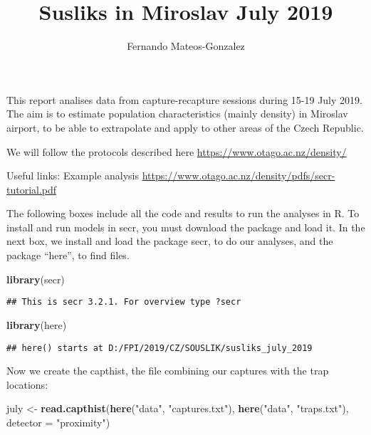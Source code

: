 \documentclass[]{article}
\title{Susliks in Miroslav July 2019}
\author{Fernando Mateos-Gonzalez}
\date{}
\newenvironment{Shaded}{\begin{snugshade}}{\end{snugshade}}
\newcommand{\DataTypeTok}[1]{\textcolor[rgb]{0.13,0.29,0.53}{#1}}
\newcommand{\KeywordTok}[1]{\textcolor[rgb]{0.13,0.29,0.53}{\textbf{#1}}}
\newcommand{\NormalTok}[1]{#1}
\newcommand{\StringTok}[1]{\textcolor[rgb]{0.31,0.60,0.02}{#1}}
\begin{document}
\maketitle

This report analises data from capture-recapture sessions during 15-19
July 2019. The aim is to estimate population characteristics (mainly
density) in Miroslav airport, to be able to extrapolate and apply to
other areas of the Czech Republic.

We will follow the protocols described here
\url{https://www.otago.ac.nz/density/}

Useful links: Example analysis
\url{https://www.otago.ac.nz/density/pdfs/secr-tutorial.pdf}

The following boxes include all the code and results to run the analyses
in R. To install and run models in secr, you must download the package
and load it. In the next box, we install and load the package secr, to
do our analyses, and the package ``here'', to find files.

\begin{Shaded}
\begin{Highlighting}[]
\KeywordTok{library}\NormalTok{(secr)}
\end{Highlighting}
\end{Shaded}

\begin{verbatim}
## This is secr 3.2.1. For overview type ?secr
\end{verbatim}

\begin{Shaded}
\begin{Highlighting}[]
\KeywordTok{library}\NormalTok{(here)}
\end{Highlighting}
\end{Shaded}

\begin{verbatim}
## here() starts at D:/FPI/2019/CZ/SOUSLIK/susliks_july_2019
\end{verbatim}

Now we create the capthist, the file combining our captures with the
trap locations:

\begin{Shaded}
\begin{Highlighting}[]
\NormalTok{july <-}\StringTok{ }\KeywordTok{read.capthist}\NormalTok{(}\KeywordTok{here}\NormalTok{(}\StringTok{"data"}\NormalTok{, }\StringTok{"captures.txt"}\NormalTok{), }\KeywordTok{here}\NormalTok{(}\StringTok{"data"}\NormalTok{, }\StringTok{"traps.txt"}\NormalTok{), }\DataTypeTok{detector =} \StringTok{"proximity"}\NormalTok{)}
\end{Highlighting}
\end{Shaded}
\end{document}
